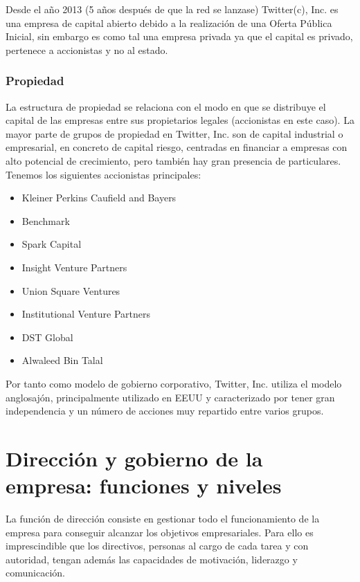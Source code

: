 Desde el año 2013 (5 años después de que la red se lanzase) Twitter(c), Inc. es una empresa de capital abierto debido a la realización de una Oferta Pública Inicial, sin embargo es como tal una empresa privada ya que el capital es privado, pertenece a accionistas y no al estado.

\subsubsection{Propiedad}

La estructura de propiedad se relaciona con el modo en que se distribuye el capital de las empresas entre sus propietarios legales (accionistas en este caso). La mayor parte de grupos de propiedad en Twitter, Inc. son de capital industrial o empresarial, en concreto de capital riesgo, centradas en financiar a empresas con alto potencial de crecimiento, pero también hay gran presencia de particulares. Tenemos los siguientes accionistas principales:

\begin{itemize}

\item Kleiner Perkins Caufield and Bayers
\item Benchmark
\item Spark Capital
\item Insight Venture Partners
\item Union Square Ventures
\item Institutional Venture Partners
\item DST Global
\item Alwaleed Bin Talal

\end{itemize}

Por tanto como modelo de gobierno corporativo, Twitter, Inc. utiliza el modelo anglosajón, principalmente utilizado en EEUU y caracterizado por tener gran independencia y un número de acciones muy repartido entre varios grupos.

\section{Dirección y gobierno de la empresa: funciones y niveles}

La función de dirección consiste en gestionar todo el funcionamiento de la empresa para conseguir alcanzar los objetivos empresariales. Para ello es imprescindible que los directivos, personas al cargo de cada tarea y con autoridad, tengan además las capacidades de motivación, liderazgo y comunicación.

